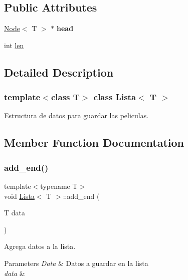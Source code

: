 \subsection*{Public Attributes}
\begin{DoxyCompactItemize}
\item 
\mbox{\label{classLista_a4c7598b64da421aa84a1591d3dfa7626}} 
\hyperlink{classNode}{Node}$<$ T $>$ $\ast$ {\bfseries head}
\item 
int \hyperlink{classLista_a091894d515b7cf5ce75cfec9d8f65dbe}{len}
\end{DoxyCompactItemize}


\subsection{Detailed Description}
\subsubsection*{template$<$class T$>$\newline
class Lista$<$ T $>$}

Estructura de datos para guardar las peliculas. 

\subsection{Member Function Documentation}
\mbox{\label{classLista_a48b79118586cc9e1984472cccaee272c}} 
\subsubsection{\texorpdfstring{add\+\_\+end()}{add\_end()}}
{\footnotesize\ttfamily template$<$typename T$>$ \\
void \hyperlink{classLista}{Lista}$<$ T $>$\+::add\+\_\+end (\begin{DoxyParamCaption}\item[{T}]{data }\end{DoxyParamCaption})}



Agrega datos a la lista. 


\begin{DoxyParams}{Parameters}
{\em Data} & Datos a guardar en la lista\\
\hline
{\em data} & \\
\hline
\end{DoxyParams}
\mbox{\label{classLista_acbab7f54b31ec1de68d13e02b3d265da}} 
